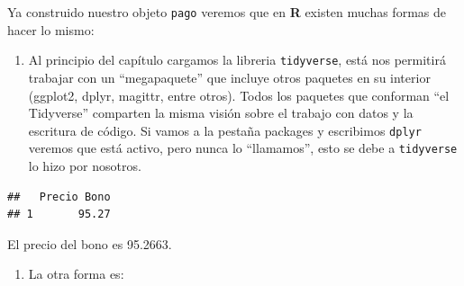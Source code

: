 \documentclass[12pt,]{book}
\newenvironment{Shaded}{\begin{snugshade}}{\end{snugshade}}
\newcommand{\KeywordTok}[1]{\textcolor[rgb]{0.13,0.29,0.53}{\textbf{#1}}}
\newcommand{\DataTypeTok}[1]{\textcolor[rgb]{0.13,0.29,0.53}{#1}}
\newcommand{\DecValTok}[1]{\textcolor[rgb]{0.00,0.00,0.81}{#1}}
\newcommand{\StringTok}[1]{\textcolor[rgb]{0.31,0.60,0.02}{#1}}
\newcommand{\OperatorTok}[1]{\textcolor[rgb]{0.81,0.36,0.00}{\textbf{#1}}}
\newcommand{\NormalTok}[1]{#1}
\providecommand{\tightlist}{%
  \setlength{\itemsep}{0pt}\setlength{\parskip}{0pt}}
\begin{document}
Ya construido nuestro objeto \texttt{pago} veremos que en \textbf{R}
existen muchas formas de hacer lo mismo:

\begin{enumerate}
\def\labelenumi{\arabic{enumi}.}
\tightlist
\item
  Al principio del capítulo cargamos la libreria \texttt{tidyverse},
  está nos permitirá trabajar con un ``megapaquete'' que incluye otros
  paquetes en su interior (ggplot2, dplyr, magittr, entre otros). Todos
  los paquetes que conforman ``el Tidyverse'' comparten la misma visión
  sobre el trabajo con datos y la escritura de código. Si vamos a la
  pestaña packages y escribimos \texttt{dplyr} veremos que está activo,
  pero nunca lo ``llamamos'', esto se debe a \texttt{tidyverse} lo hizo
  por nosotros.
\end{enumerate}

\begin{Shaded}
\end{Shaded}

\begin{verbatim}
##   Precio Bono
## 1       95.27
\end{verbatim}

El precio del bono es 95.2663.

\begin{enumerate}
\def\labelenumi{\arabic{enumi}.}
\setcounter{enumi}{1}
\tightlist
\item
  La otra forma es:
\end{enumerate}
\end{document}
